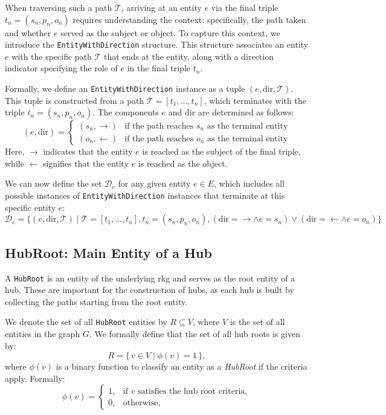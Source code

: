 When traversing such a path \( \mathcal{T} \), arriving at an entity \( e \) via the final triple \( t_n = (s_n, p_n, o_n) \) requires understanding the context: specifically, the path taken and whether \( e \) served as the subject or object. To capture this context, we introduce the \texttt{EntityWithDirection} structure. This structure associates an entity \( e \) with the specific path \( \mathcal{T} \) that ends at the entity, along with a direction indicator specifying the role of \( e \) in the final triple \( t_n \). 

Formally, we define an \texttt{EntityWithDirection} instance as a tuple \( (e, \text{dir}, \mathcal{T}) \). This tuple is constructed from a path \( \mathcal{T} = [t_1, \ldots, t_n] \), which terminates with the triple \( t_n = (s_n, p_n, o_n) \). The components \( e \) and \( \text{dir} \) are determined as follows:
\[
(e, \text{dir}) =
\begin{cases}
(s_n, \rightarrow) & \text{if the path reaches } s_n \text{ as the terminal entity} \\
(o_n, \leftarrow) & \text{if the path reaches } o_n \text{ as the terminal entity}
\end{cases}
\]
Here, \( \rightarrow \) indicates that the entity \( e \) is reached as the subject of the final triple, while \( \leftarrow \) signifies that the entity \( e \) is reached as the object.

We can now define the set \( \mathcal{D}_e \) for any given entity \( e \in E \), which includes all possible instances of \texttt{EntityWithDirection} instances that terminate at this specific entity \( e \):
\[
\mathcal{D}_e = \Big\{ (e, \text{dir}, \mathcal{T}) \;\Big|\;
\mathcal{T} = [t_1, \ldots, t_n], 
t_n = (s_n, p_n, o_n), 
(\text{dir} = \rightarrow \land e = s_n) \lor (\text{dir} = \leftarrow \land e = o_n)
\Big\}
\]

\subsection{HubRoot: Main Entity of a Hub}
\label{sec:hublink_hubroot_definition}

A \texttt{HubRoot} is an entity of the underlying \gls{rkg} and serves as the root entity of a hub. These are important for the construction of hubs, as each hub is built by collecting the paths starting from the root entity.

We denote the set of all \texttt{HubRoot} entities by \(R \subseteq V\), where \(V\) is the set of all entities in the graph \(G\). We formally define that the set of all hub roots is given by:
\[
R = \{\, v \in V \mid \phi(v) = 1 \,\},
\]
where $\phi(v)$ is a binary function to classify an entity as a \emph{HubRoot} if the criteria apply. Formally:
\[
\phi(v)=
\begin{cases}
1, & \text{if } v \text{ satisfies the hub root criteria}, \\
0, & \text{otherwise},
\end{cases}
\]

